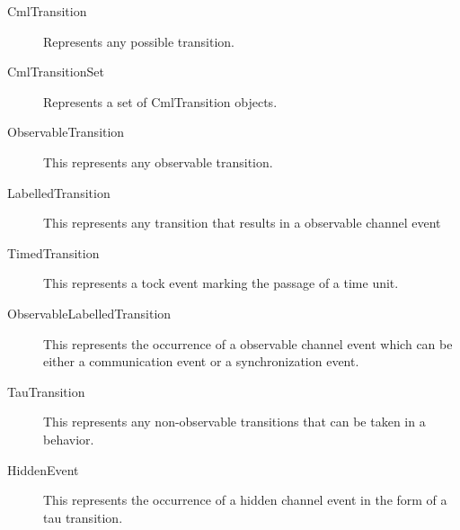 \documentclass[a4paper, 10pt]{include/compassreport}   %
\begin{document}
\begin{description}
\item[CmlTransition] Represents any possible transition.
\item[CmlTransitionSet] Represents a set of CmlTransition objects.
\item[ObservableTransition] This represents any observable transition.
\item[LabelledTransition] This represents any transition that results
  in a observable channel event
\item[TimedTransition] This represents a tock event marking the
  passage of a time unit.
\item[ObservableLabelledTransition] This represents the occurrence of
  a observable channel event which can be either a communication event
  or a synchronization event.
\item[TauTransition] This represents any non-observable transitions
  that can be taken in a behavior.
\item[HiddenEvent] This represents the occurrence of a hidden
  channel event in the form of a tau transition.
\end{description}
\end{document}
